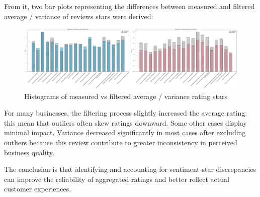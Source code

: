 \documentclass{Configuration_Files/PoliMi3i_thesis}
\begin{document}
\bigskip

From it, two bar plots representing the differences between measured and filtered average / variance of reviews stars were derived: 

\bigskip

\begin{figure}[H]
    \centering
    \includegraphics[width=\columnwidth]{imgs/query_11.png}
    \caption{Histograms of measured vs filtered average / variance rating stars}
    \label{fig:query_11}
\end{figure}

\bigskip

For many businesses, the filtering process slightly increased the average rating: this mean that outliers often skew ratings downward. Some other cases display minimal impact. Variance decreased significantly in most cases after excluding outliers because this review contribute to greater inconsistency in perceived business quality. 

The conclusion is that identifying and accounting for sentiment-star discrepancies can improve the reliability of aggregated ratings and better reflect actual customer experiences.



\bigskip 

\cleardoublepage

\listoffigures

\listoftables

\cleardoublepage
\end{document}
